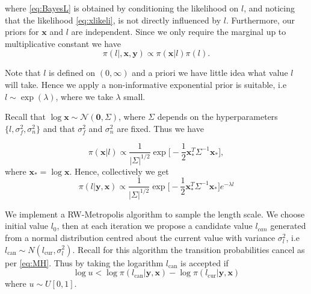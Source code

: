 \documentclass[../main.tex]{subfiles}
\begin{document}
where \eqref{eq:BayesL} is obtained by conditioning the likelihood on $l$, and noticing that the likelihood \eqref{eq:xlikeli}, is not directly influenced by $l$. Furthermore, our priors for $\mathbf{x}$ and $l$ are independent.  Since we only require the marginal up to multiplicative constant we have
 \begin{equation}
   \pi (  l | , \mathbf{x}, \mathbf{y} ) \propto \pi (\mathbf{x} | l)  \pi(l).
 \end{equation}
 
 Note that $l$ is defined on $(0,\infty)$ and a priori we have little idea what value $l$ will take. Hence we apply a non-informative exponential prior is suitable, i.e $l \sim \exp(\lambda)$, where we take $\lambda$ small. 
 
Recall that $ \log \mathbf{x} \sim \mathcal{N} (\mathbf{0}, \Sigma )$, where $\Sigma$ depends on the hyperparameters $ \{ l , \sigma_f^2, \sigma_n^2 \}$ and that $\sigma_f^2$ and $\sigma_n^2$ are fixed. Thus we have

  \begin{equation}
  \pi (\mathbf{x} |l) \propto    \frac{1}{| \Sigma |^{1/2}} \exp \big[  -\frac{1}{2} \mathbf{x}_*^T \Sigma^{-1} \mathbf{x}_* \big],
  \end{equation} 
   where $\mathbf{x}_* = \log \mathbf{x}$. Hence, collectively we get %
    \begin{equation}
  \pi (l | \mathbf{y}, \mathbf{x} ) \propto    \frac{1}{| \Sigma |^{1/2}} \exp \big[  -\frac{1}{2} \mathbf{x}_*^T \Sigma^{-1} \mathbf{x}_* \big] e^{- \lambda l}
  \end{equation} 
  
We implement a RW-Metropolis algorithm to sample the length scale. We choose initial value $l_0$, then at each iteration we propose a candidate value $l_{can}$ generated from a normal distribution centred about the current value with variance $\sigma^2_l$, i.e $l_\mathrm{can}  \sim N(l_\mathrm{cur}, \sigma^2_l)$. Recall for this algorithm the transition probabilities cancel as per \eqref{eq:MH}. Thus by taking the logarithm  $l_\mathrm{can}$  is accepted if
  \begin{equation}
  \log u < \log \pi(l_{\mathrm{can}} |  \mathbf{y}, \mathbf{x} ) - \log \pi(l_{\mathrm{cur}} |  \mathbf{y}, \mathbf{x} ) 
  \end{equation}
  where $u \sim U[0,1]$.
\end{document}
